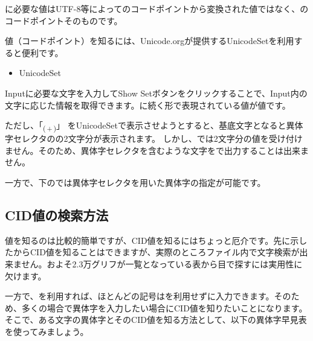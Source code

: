 \documentclass[../otf-unofficial-guide]{subfiles}
\begin{document}
に必要な{\Unicode}値は{\ptmfamily UTF-8}等によって{\Unicode}のコードポイントから変換された値ではなく、{\Unicode}のコードポイントそのものです。

{\Unicode}値（{\Unicode}コードポイント）を知るには、{\ptmfamily Unicode.org}が提供するUnicodeSetを利用すると便利です。

\begin{itemize}
  \item {\ptmfamily UnicodeSet}
\end{itemize}

\textsf{Input}に必要な文字を入力して\textsf{Show Set}ボタンをクリックすることで、\textsf{Input}内の文字に応じた情報を取得できます。に続く形で表現されている値が{\Unicode}値です。

ただし、「\textsubscript{(\,{+}\,)}」
%
を{\ptmfamily UnicodeSet}で表示させようとすると、基底文字となると異体字セレクタのの2文字分が表示されます。
しかし、では2文字分の{\Unicode}値を受け付けません。そのため、異体字セレクタを含むような文字をで出力することは出来ません。

一方で、{\upLaTeXdvipdfmx}下のでは異体字セレクタを用いた異体字の指定が可能です。

\newpage
\subsection{CID値の検索方法}

{\Unicode}値を知るのは比較的簡単ですが、CID値を知るにはちょっと厄介です。先に示したからCID値を知ることはできますが、実際のところファイル内で文字検索が出来ません。およそ2.3万グリフが一覧となっている表から目で探すには実用性に欠けます。

一方で、を利用すれば、ほとんどの記号はを利用せずに入力できます。そのため、多くの場合で異体字を入力したい場合にCID値を知りたいことになります。
そこで、ある文字の異体字とそのCID値を知る方法として、以下の異体字早見表を使ってみましょう。
\end{document}

